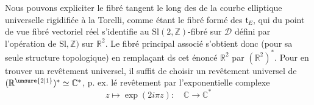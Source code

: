 

Nous pouvons expliciter le fibré tangent le long des   de la courbe elliptique universelle rigidifiée à la Torelli, comme étant le fibré formé des $\mathfrak{t}_E$, qui du point de vue fibré vectoriel réel s'identifie au  $\mathrm{Sl}(2,\mathbb{Z})$-fibré sur $\mathscr D$ défini par l'opération  de $\mathrm{Sl},\mathbb{Z})$ sur $\mathbb{R}^2$. Le fibré principal associé  s'obtient donc (pour sa seule structure topologique) en remplaçant ds cet énoncé $\mathbb{R}^{2}$ par $(\mathbb{R}^2)^*$. Pour en trouver un revêtement universel, il suffit de choisir un revêtement universel de $(\mathbb{R}^{\unsure{2|1}})^*\simeq\mathbb{C}^*$, p. ex. lé revêtement par l'exponentielle complexe
\[
z\mapsto\exp(2i\pi z):\quad\mathbb{C}\longrightarrow\mathbb{C}^*
\]

